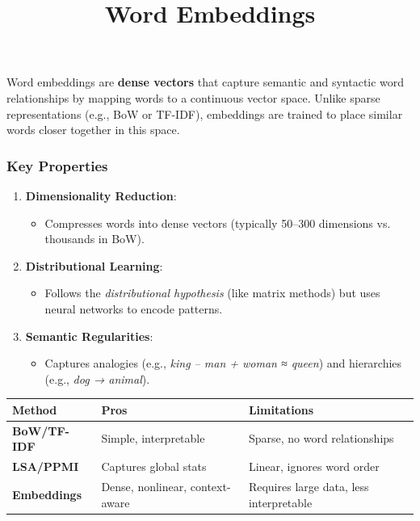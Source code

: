 \documentclass[
]{article}
\title{Word Embeddings}
\author{}
\date{}
\providecommand{\tightlist}{%
  \setlength{\itemsep}{0pt}\setlength{\parskip}{0pt}}
\begin{document}
\maketitle

Word embeddings are \textbf{dense vectors} that capture semantic and
syntactic word relationships by mapping words to a continuous vector
space. Unlike sparse representations (e.g., BoW or TF-IDF), embeddings
are trained to place similar words closer together in this space.

\hypertarget{key-properties}{%
\subsubsection{\texorpdfstring{\textbf{Key
Properties}}{Key Properties}}\label{key-properties}}

\begin{enumerate}
\tightlist
\item
  \textbf{Dimensionality Reduction}:

  \begin{itemize}
  \tightlist
  \item
    Compresses words into dense vectors (typically 50--300 dimensions
    vs. thousands in BoW).
  \end{itemize}
\item
  \textbf{Distributional Learning}:

  \begin{itemize}
  \tightlist
  \item
    Follows the \emph{distributional hypothesis} (like matrix methods)
    but uses neural networks to encode patterns.
  \end{itemize}
\item
  \textbf{Semantic Regularities}:

  \begin{itemize}
  \tightlist
  \item
    Captures analogies (e.g., \emph{king -- man + woman ≈ queen}) and
    hierarchies (e.g., \emph{dog → animal}).
  \end{itemize}
\end{enumerate}

\begin{longtable}[]{@{}lll@{}}
\toprule\noalign{}
Method & Pros & Limitations \\
\midrule\noalign{}
\endhead
\bottomrule\noalign{}
\endlastfoot
\textbf{BoW/TF-IDF} & Simple, interpretable & Sparse, no word
relationships \\
\textbf{LSA/PPMI} & Captures global stats & Linear, ignores word
order \\
\textbf{Embeddings} & Dense, nonlinear, context-aware & Requires large
data, less interpretable \\
\end{longtable}
\end{document}
